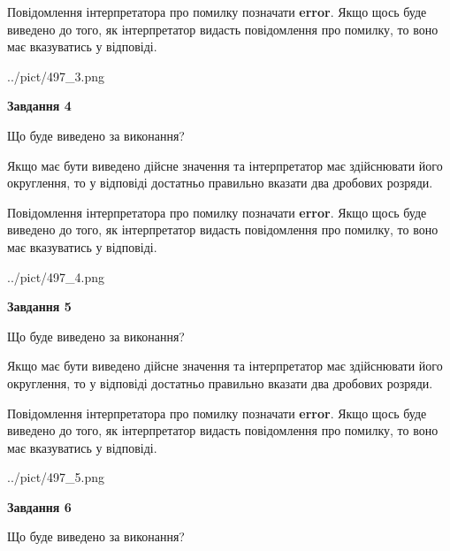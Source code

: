 \documentclass[12pt, ukrainian]{article}
\begin{document}
{\begin {Large}
Повідомлення інтерпретатора про помилку позначати \textbf{error}.
Якщо щось буде виведено до того, як інтерпретатор видасть повідомлення про помилку, 
то воно має вказуватись у відповіді. \par

\begin{center}
	{../pict/497_3.png}
\end{center}
\newpage

{\begin {center}\textbf{Завдання 4}\end {center}}\par
Що буде виведено за виконання? \par

Якщо має бути виведено дійсне значення та інтерпретатор має здійснювати його округлення, 
то у відповіді достатньо правильно вказати два дробових розряди.

Повідомлення інтерпретатора про помилку позначати \textbf{error}.
Якщо щось буде виведено до того, як інтерпретатор видасть повідомлення про помилку, 
то воно має вказуватись у відповіді. \par

\begin{center}
	{../pict/497_4.png}
\end{center}
\newpage

{\begin {center}\textbf{Завдання 5}\end {center}}\par
Що буде виведено за виконання? \par

Якщо має бути виведено дійсне значення та інтерпретатор має здійснювати його округлення, 
то у відповіді достатньо правильно вказати два дробових розряди.

Повідомлення інтерпретатора про помилку позначати \textbf{error}.
Якщо щось буде виведено до того, як інтерпретатор видасть повідомлення про помилку, 
то воно має вказуватись у відповіді. \par

\begin{center}
	{../pict/497_5.png}
\end{center}
\newpage

{\begin {center}\textbf{Завдання 6}\end {center}}\par
Що буде виведено за виконання? \par


\end{Large}}
\end{document}
